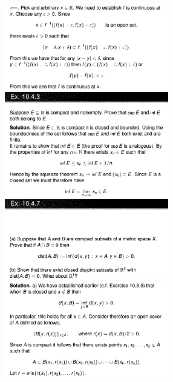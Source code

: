 \documentclass[8pt,landscape]{article}
\begin{document}
\begin{multicols}{3}
    \includegraphics[width=270]{Slides11.png} \\
    \includegraphics[width=270]{Slides12.png} \\
    \includegraphics[width=270]{Slides13.png} \\
    \includegraphics[width=270]{Slides14.png} \\

\end{multicols}
\end{document}

